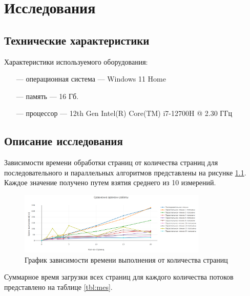\chapter{Исследования}

\section{Технические характеристики}
Характеристики используемого оборудования:
\begin{itemize}
    \item[---] операционная система --- Windows 11 Home \cite{windows}
    \item[---] память --- 16 Гб.
    \item[---] процессор --- 12th Gen Intel(R) Core(TM) i7-12700H @  2.30 ГГц \cite{intel}
\end{itemize}

\section{Описание исследования}

Зависимости времени обработки страниц от количества страниц для последовательного и параллельных алгоритмов представлены на рисунке \ref{fig:plot}. Каждое значение получено путем взятия среднего из 10 измерений.

\begin{figure}[h]
	\centering
	\includegraphics[width=0.8\textwidth]{images/plot.png}
	\caption{График зависимости времени выполнения от количества страниц}
	\label{fig:plot}
\end{figure}

\clearpage

Суммарное время загрузки всех страниц для каждого количества потоков представлено на таблице \ref{tbl:mes}.

